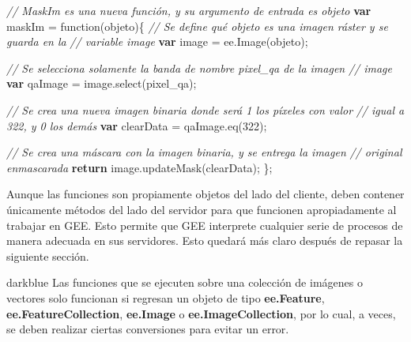\documentclass[
  12pt,
  letterpaper,
  twoside]{book}
\newenvironment{Shaded}{\begin{snugshade}}{\end{snugshade}}
\newcommand{\CommentTok}[1]{\textcolor[rgb]{0.24,0.58,0.00}{\textit{#1}}}
\newcommand{\ControlFlowTok}[1]{\textcolor[rgb]{0.00,0.00,0.00}{\textbf{#1}}}
\newcommand{\DecValTok}[1]{\textcolor[rgb]{0.28,0.53,0.93}{#1}}
\newcommand{\FunctionTok}[1]{\textcolor[rgb]{0.48,0.12,0.64}{#1}}
\newcommand{\KeywordTok}[1]{\textcolor[rgb]{0.48,0.12,0.64}{#1}}
\newcommand{\NormalTok}[1]{#1}
\newcommand{\OperatorTok}[1]{\textcolor[rgb]{0.00,0.00,0.00}{#1}}
\newcommand{\StringTok}[1]{\textcolor[rgb]{0.87,0.29,0.22}{#1}}
\newcommand\boldpurple[1]{\textcolor{darkpurple}{\textbf{#1}}}
\begin{document}
\begin{Shaded}
\begin{Highlighting}[]
\CommentTok{// MaskIm es una nueva función, y su argumento de entrada es objeto}
\ControlFlowTok{var}\NormalTok{ maskIm }\OperatorTok{=} \KeywordTok{function}\NormalTok{(objeto)\{ }
  \CommentTok{// Se define qué objeto es una imagen ráster y se guarda en la }
  \CommentTok{// variable image}
  \ControlFlowTok{var}\NormalTok{ image }\OperatorTok{=} \KeywordTok{ee}\OperatorTok{.}\FunctionTok{Image}\NormalTok{(objeto)}\OperatorTok{;}
   
  \CommentTok{// Se selecciona solamente la banda de nombre \textquotesingle{}pixel\_qa\textquotesingle{} de la imagen}
  \CommentTok{// image}
  \ControlFlowTok{var}\NormalTok{ qaImage }\OperatorTok{=}\NormalTok{ image}\OperatorTok{.}\FunctionTok{select}\NormalTok{(}\StringTok{\textquotesingle{}pixel\_qa\textquotesingle{}}\NormalTok{)}\OperatorTok{;}
       
  \CommentTok{// Se crea una nueva imagen binaria donde será 1 los píxeles con valor }
  \CommentTok{// igual a 322, y 0 los demás}
  \ControlFlowTok{var}\NormalTok{ clearData }\OperatorTok{=}\NormalTok{ qaImage}\OperatorTok{.}\FunctionTok{eq}\NormalTok{(}\DecValTok{322}\NormalTok{)}\OperatorTok{;}      
      
  \CommentTok{// Se crea una máscara con la imagen binaria, y se entrega la imagen }
  \CommentTok{// original enmascarada}
  \ControlFlowTok{return}\NormalTok{ image}\OperatorTok{.}\FunctionTok{updateMask}\NormalTok{(clearData)}\OperatorTok{;}      
\NormalTok{ \}}\OperatorTok{;}
\end{Highlighting}
\end{Shaded}

Aunque las funciones son propiamente objetos del lado del cliente, deben contener únicamente métodos del lado del servidor para que funcionen apropiadamente al trabajar en GEE. Esto permite que GEE interprete cualquier serie de procesos de manera adecuada en sus servidores. Esto quedará más claro después de repasar la siguiente sección.

\begin{bluebox2}

\begin{awesomeblock}{5pt}{\faLightbulb}{darkblue}
Las funciones que se ejecuten sobre una colección de imágenes o vectores solo funcionan si regresan un objeto de tipo \boldpurple{ee.Feature}, \boldpurple{ee.FeatureCollection}, \boldpurple{ee.Image} o \boldpurple{ee.ImageCollection}, por lo cual, a veces, se deben realizar ciertas conversiones para evitar un error.

\end{awesomeblock}

\end{bluebox2}
\end{document}

